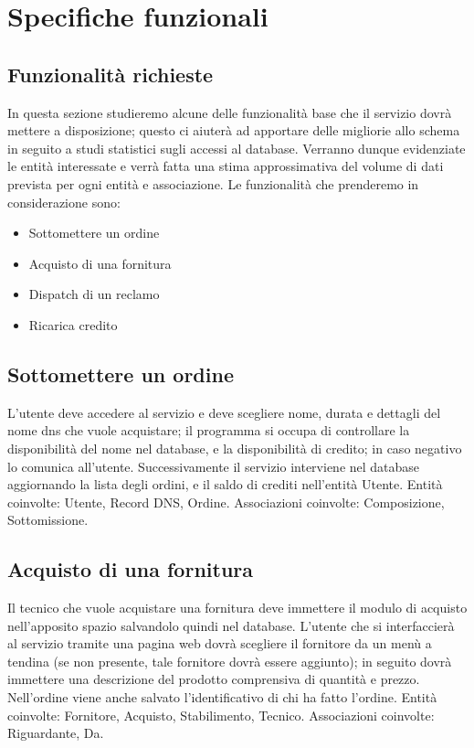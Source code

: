 \documentclass[11pt,a4paper] {article}
\begin{document}
\newpage
\section{Specifiche funzionali}
\subsection{Funzionalit\`a richieste}
In questa sezione studieremo alcune delle funzionalità base che il servizio dovr\`a mettere a disposizione; questo ci aiuter\`a ad apportare delle migliorie allo schema in seguito a studi statistici sugli accessi al database. Verranno dunque evidenziate le entit\`a interessate e verrà fatta una stima approssimativa del volume di dati prevista per ogni entit\`a e associazione.
\newline
Le funzionalit\`a che prenderemo in considerazione sono:
\begin{itemize}
\item Sottomettere un ordine
\item Acquisto di una fornitura
\item Dispatch di un reclamo
\item Ricarica credito
\end{itemize}

\subsection{Sottomettere un ordine}
L'utente deve accedere al servizio e deve scegliere nome, durata e dettagli del nome dns che vuole acquistare; il programma si occupa di controllare la disponibilit\`a del nome nel database, e la disponibilit\`a di credito; in caso negativo lo comunica all'utente. Successivamente il servizio interviene nel database aggiornando la lista degli ordini, e il saldo di crediti nell'entit\`a Utente.
\newline
\newline
Entit\`a coinvolte: Utente, Record DNS, Ordine.
\newline
Associazioni coinvolte: Composizione, Sottomissione.

\subsection{Acquisto di una fornitura}
Il tecnico che vuole acquistare una fornitura deve immettere il modulo di acquisto nell'apposito spazio salvandolo quindi nel database. L'utente che si interfaccier\`a al servizio tramite una pagina web dovr\`a scegliere il fornitore da un men\`u a tendina (se non presente, tale fornitore dovr\`a essere aggiunto); in seguito dovr\`a immettere una descrizione del prodotto comprensiva di quantità e prezzo. Nell'ordine viene anche salvato l'identificativo di chi ha fatto l'ordine.
\newline
\newline
Entit\`a coinvolte: Fornitore, Acquisto, Stabilimento, Tecnico.
\newline
Associazioni coinvolte: Riguardante, Da.
\end{document}
